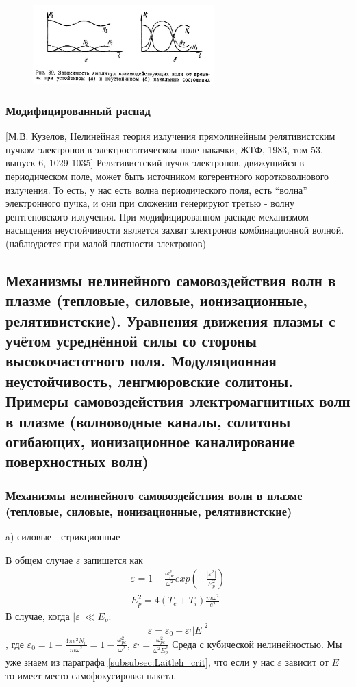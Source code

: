 \documentclass[10pt, a4paper]{article}
\begin{document}
\begin{figure}[ht]
	\begin{center}
		\includegraphics[width=70mm]{Wavetrans2.JPG}
	\end{center}
\end{figure}

\subsubsection{Модифицированный распад}
[М.В. Кузелов, Нелинейная теория излучения прямолинейным релятивистским пучком электронов в электростатическом поле накачки, ЖТФ, 1983, том 53, выпуск 6, 1029-1035]
Релятивистский пучок электронов, движущийся в периодическом поле, может быть источником когерентного коротковолнового излучения.
То есть, у нас есть волна периодического поля, есть “волна” электронного пучка, и они при сложении генерируют третью - волну рентгеновского излучения. 
При  модифицированном распаде механизмом насыщения неустойчивости является захват электронов комбинационной волной.(наблюдается при малой плотности электронов)




\subsection{Механизмы нелинейного самовоздействия волн в плазме (тепловые, силовые, ионизационные, релятивистские). Уравнения движения плазмы с учётом усреднённой силы со стороны высокочастотного поля. Модуляционная неустойчивость, ленгмюровские солитоны. Примеры самовоздействия электромагнитных волн в плазме (волноводные каналы, солитоны огибающих, ионизационное каналирование поверхностных волн)}

\label{subsec:nonlinearwaves}
\subsubsection{Механизмы нелинейного самовоздействия волн в плазме (тепловые, силовые, ионизационные, релятивистские)}
a) силовые - стрикционные


В общем случае $\varepsilon$ запишется как
\begin{align}
	\varepsilon=1-\frac{\omega^2_{pe}}{\omega^2} exp(-\frac{|\varepsilon^2|}{E^2_p})\\
	E^2_p=4(T_e + T_i) \frac{m \omega^2}{e^2}
\end{align}
В случае, когда $|\varepsilon| \ll E_p$:
\begin{equation}
	\varepsilon=\varepsilon_0 +\varepsilon^{,} |E|^2
\end{equation}
, где $\varepsilon_0=1-\frac{4 \pi e^2 N_0}{m \omega^2}=1-\frac{\omega^2_{pe}}{\omega^2}$, $\varepsilon^{,}=\frac{\omega^2_{pe}}{\omega^2 E^2_p}$ Среда с кубической нелинейностью. Мы уже знаем из параграфа \ref{subsubsec:Laitleh_crit}, что если у нас $\varepsilon$ зависит от $E$ то имеет место самофокусировка пакета.
\end{document}
